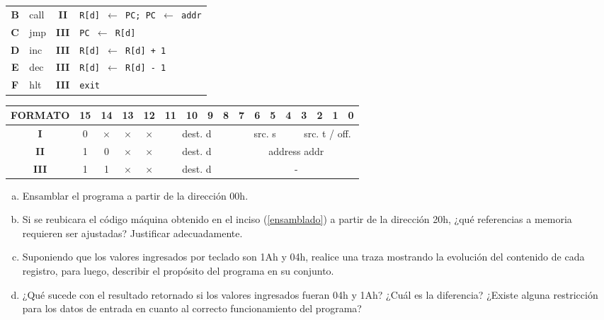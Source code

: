 \documentclass[12pt,a4paper]{article}
\begin{document}
\begin{small}
\begin{minipage}{.6\textwidth}
\begin{tabular}{|c|l|c|l|}
			\textbf{B} & \textsf{call}  & \textbf{II} & \texttt{R[d] $\leftarrow$ PC; PC $\leftarrow$ addr} \\
			\textbf{C} & \textsf{jmp}   & \textbf{III} & \texttt{PC $\leftarrow$ R[d]} \\
			\textbf{D} & \textsf{inc}   & \textbf{III} & \texttt{R[d] $\leftarrow$ R[d] + 1} \\
			\textbf{E} & \textsf{dec}   & \textbf{III} & \texttt{R[d] $\leftarrow$ R[d] - 1} \\
			\textbf{F} & \textsf{hlt}   & \textbf{III} & \texttt{exit} \\ \hline
		\end{tabular}	
	\end{minipage}
	\begin{center}
		\begin{tabular}{*{17}{c}}
			\textsf{FORMATO} & 15 & 14 & 13 & 12 & 11 & 10 & 9 & 8 & 7 & 6 & 5 & 4 & 3 & 2 & 1 & 0 \\ \hline
			\multicolumn{1}{|c|}{\textbf{I}} & 0 & $\times$ & $\times$ & $\times$ &
			\multicolumn{4}{|c|}{\textsf{dest. d}} &
			\multicolumn{4}{|c|}{\textsf{src. s}} &
			\multicolumn{4}{|c|}{\textsf{src. t / off.}} \\ \hline
			\multicolumn{1}{|c|}{\textbf{II}} & 1 & 0 & $\times$ & $\times$ &
			\multicolumn{4}{|c|}{\textsf{dest. d}} &
			\multicolumn{8}{|c|}{\textsf{address addr}} \\ \hline
			\multicolumn{1}{|c|}{\textbf{III}} & 1 & 1 & $\times$ & $\times$ &
			\multicolumn{4}{|c|}{\textsf{dest. d}} &
			\multicolumn{8}{|c|}{\textsf{-}} \\ \hline
		\end{tabular}
	\end{center}		
\end{small}
\begin{small}
\begin{enumerate}[a)]
	\item Ensamblar el programa a partir de la dirección 00h. \label{ensamblado}
	\item Si se reubicara el código máquina obtenido en el inciso (\ref{ensamblado}) a partir de la dirección 20h, ¿qué referencias a memoria requieren ser ajustadas? Justificar adecuadamente.
	\item Suponiendo que los valores ingresados por teclado son 1Ah y 04h, realice una traza mostrando la evolución del contenido de cada registro, para luego, describir el propósito del programa en su conjunto.
	\item ¿Qué sucede con el resultado retornado si los valores ingresados fueran 04h y 1Ah? ¿Cuál es la diferencia? ¿Existe alguna restricción para los datos de entrada en cuanto al correcto funcionamiento del programa?
\end{enumerate}
\end{small}
\end{document}
